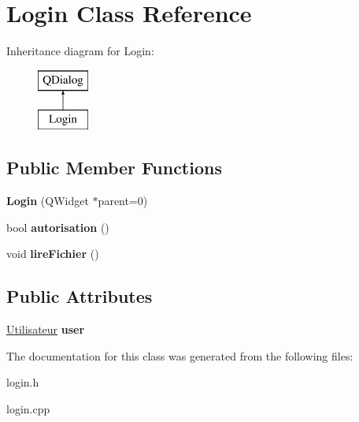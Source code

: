 \hypertarget{class_login}{}\section{Login Class Reference}
\label{class_login}
Inheritance diagram for Login\+:\begin{figure}[H]
\begin{center}
\leavevmode
\includegraphics[height=2.000000cm]{class_login}
\end{center}
\end{figure}
\subsection*{Public Member Functions}
\begin{DoxyCompactItemize}
\item 
\mbox{\label{class_login_a021ebcfd29b2a30e3f5c5bbb36589381}} 
{\bfseries Login} (Q\+Widget $\ast$parent=0)
\item 
\mbox{\label{class_login_ab6e2f801e7106b79425ae7c84bc8cd09}} 
bool {\bfseries autorisation} ()
\item 
\mbox{\label{class_login_a6e5865295833745434c41e363fef3861}} 
void {\bfseries lire\+Fichier} ()
\end{DoxyCompactItemize}
\subsection*{Public Attributes}
\begin{DoxyCompactItemize}
\item 
\mbox{\label{class_login_af691b5ea63279c19dc46d172ddd302a6}} 
\mbox{\hyperlink{class_utilisateur}{Utilisateur}} {\bfseries user}
\end{DoxyCompactItemize}


The documentation for this class was generated from the following files\+:\begin{DoxyCompactItemize}
\item 
login.\+h\item 
login.\+cpp\end{DoxyCompactItemize}
